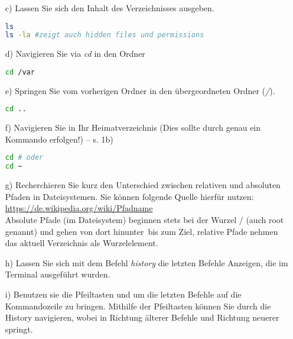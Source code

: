 \documentclass[paper=a4,fontsize=11pt]{scrartcl}%
\numberwithin{equation}{section}
\begin{document}
{\begin{enumerate}
\begin{itemize}
		Lassen Sie sich anschließend Ihr aktuelles Verzeichnis auf der Kommandozeile ausgeben! Dies ist standardmäßig Ihr Heimatverzeichnis \footnote{Auch \glqq home directory \grqq: $\sim$ oder ausgeschrieben  auf dem Raspberry Pi bzw.  auf den Laborrechnern}.\\
\begin{lstlisting}[style=Bash, language=Bash]
pwd
		\end{lstlisting}
		\item[c)] Lassen Sie sich den Inhalt des Verzeichnisses ausgeben.\\
\begin{lstlisting}[style=Bash, language=Bash]
ls
ls -la #zeigt auch hidden files und permissions
		\end{lstlisting}
		\item[d)] Navigieren Sie via \emph{cd} in den Ordner \\
\begin{lstlisting}[style=Bash, language=Bash]
cd /var
		\end{lstlisting}
		\item[e)] Springen Sie vom vorherigen Ordner in den übergeordneten Ordner (\emph{/}).\\
\begin{lstlisting}[style=Bash, language=Bash]
cd .. 
	\end{lstlisting}
		\item[f)] Navigieren Sie in Ihr Heimatverzeichnis (Dies sollte durch genau ein Kommando erfolgen!) -- s. 1b)\\
\begin{lstlisting}[style=Bash, language=Bash]
cd # oder
cd ~
		\end{lstlisting}
		\item[g)] Recherchieren Sie kurz den Unterschied zwischen relativen und absoluten Pfaden in Dateisystemen. Sie können folgende Quelle hierfür nutzen: \url{https://de.wikipedia.org/wiki/Pfadname}\\
		Absolute Pfade (im Dateisystem) beginnen stets bei der Wurzel / (auch root genannt) und gehen von dort \glqq hinunter\grqq\ bis zum Ziel, relative Pfade nehmen das aktuell Verzeichnis als Wurzelelement.
		\item[h)] Lassen Sie sich mit dem Befehl \emph{history} die letzten Befehle Anzeigen, die im Terminal ausgeführt wurden. 
		\item[i)] Benutzen sie die Pfeiltasten \keys{\arrowkeyup} und \keys{\arrowkeydown} um die letzten Befehle auf die Kommandozeile zu bringen. Mithilfe der Pfeiltasten können Sie durch die History navigieren, wobei \keys{\arrowkeyup} in Richtung älterer Befehle und \keys{\arrowkeydown} Richtung neuerer springt.

\end{itemize}
\end{enumerate}}
\end{document}
